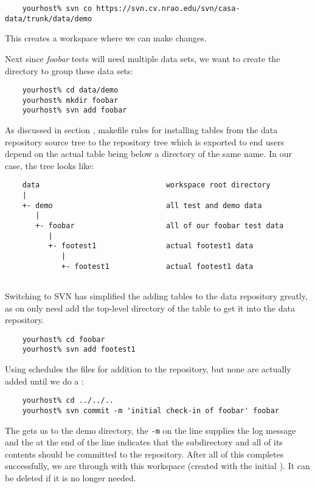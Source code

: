 \begin{verbatim}
    yourhost% svn co https://svn.cv.nrao.edu/svn/casa-data/trunk/data/demo
\end{verbatim}

\noindent
This creates a workspace where we can make changes.

Next since \textit{foobar} tests will need multiple data sets, we want to
create the directory to group these data sets:

\begin{verbatim}
    yourhost% cd data/demo
    yourhost% mkdir foobar
    yourhost% svn add foobar
\end{verbatim}

As discussed in section , makefile rules
for installing tables from the data repository source tree to the repository
tree which is exported to end users depend on the actual table being below
a directory of the same name. In our case, the tree looks like:

\begin{verbatim}
    data                             workspace root directory
    |
    +- demo                          all test and demo data
       |
       +- foobar                     all of our foobar test data
          |
          +- footest1                actual footest1 data
             |
             +- footest1             actual footest1 data
                     
\end{verbatim}

\noindent
Switching to SVN has simplified the adding tables to the data repository
greatly, as on only need add the top-level directory of the table to get
it into the data repository.

\begin{verbatim}
    yourhost% cd foobar
    yourhost% svn add footest1
\end{verbatim}

\noindent
Using  schedules the files for addition to the repository, but
none are actually added until we do a :

\begin{verbatim}
    yourhost% cd ../../..
    yourhost% svn commit -m 'initial check-in of foobar' foobar
\end{verbatim}

\noindent
The  gets us to the demo directory, the \verb+-m+ on the
 line supplies the log message and the  at the end
of the line indicates that the  subdirectory and all of its 
contents should be committed to the repository. After all of this completes
successfully, we are through with this workspace (created with the initial
). It can be deleted if it is no longer needed.

